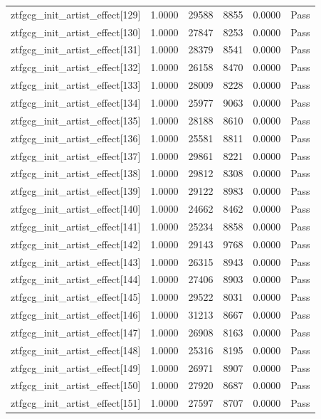 \begin{table}[htbp]
\begin{tabular}{llrrll}
ztfgcg\_init\_artist\_effect[129] & 1.0000 & 29588 & 8855 & 0.0000 & Pass \\
ztfgcg\_init\_artist\_effect[130] & 1.0000 & 27847 & 8253 & 0.0000 & Pass \\
ztfgcg\_init\_artist\_effect[131] & 1.0000 & 28379 & 8541 & 0.0000 & Pass \\
ztfgcg\_init\_artist\_effect[132] & 1.0000 & 26158 & 8470 & 0.0000 & Pass \\
ztfgcg\_init\_artist\_effect[133] & 1.0000 & 28009 & 8228 & 0.0000 & Pass \\
ztfgcg\_init\_artist\_effect[134] & 1.0000 & 25977 & 9063 & 0.0000 & Pass \\
ztfgcg\_init\_artist\_effect[135] & 1.0000 & 28188 & 8610 & 0.0000 & Pass \\
ztfgcg\_init\_artist\_effect[136] & 1.0000 & 25581 & 8811 & 0.0000 & Pass \\
ztfgcg\_init\_artist\_effect[137] & 1.0000 & 29861 & 8221 & 0.0000 & Pass \\
ztfgcg\_init\_artist\_effect[138] & 1.0000 & 29812 & 8308 & 0.0000 & Pass \\
ztfgcg\_init\_artist\_effect[139] & 1.0000 & 29122 & 8983 & 0.0000 & Pass \\
ztfgcg\_init\_artist\_effect[140] & 1.0000 & 24662 & 8462 & 0.0000 & Pass \\
ztfgcg\_init\_artist\_effect[141] & 1.0000 & 25234 & 8858 & 0.0000 & Pass \\
ztfgcg\_init\_artist\_effect[142] & 1.0000 & 29143 & 9768 & 0.0000 & Pass \\
ztfgcg\_init\_artist\_effect[143] & 1.0000 & 26315 & 8943 & 0.0000 & Pass \\
ztfgcg\_init\_artist\_effect[144] & 1.0000 & 27406 & 8903 & 0.0000 & Pass \\
ztfgcg\_init\_artist\_effect[145] & 1.0000 & 29522 & 8031 & 0.0000 & Pass \\
ztfgcg\_init\_artist\_effect[146] & 1.0000 & 31213 & 8667 & 0.0000 & Pass \\
ztfgcg\_init\_artist\_effect[147] & 1.0000 & 26908 & 8163 & 0.0000 & Pass \\
ztfgcg\_init\_artist\_effect[148] & 1.0000 & 25316 & 8195 & 0.0000 & Pass \\
ztfgcg\_init\_artist\_effect[149] & 1.0000 & 26971 & 8907 & 0.0000 & Pass \\
ztfgcg\_init\_artist\_effect[150] & 1.0000 & 27920 & 8687 & 0.0000 & Pass \\
ztfgcg\_init\_artist\_effect[151] & 1.0000 & 27597 & 8707 & 0.0000 & Pass \\

\end{tabular}
\end{table}
